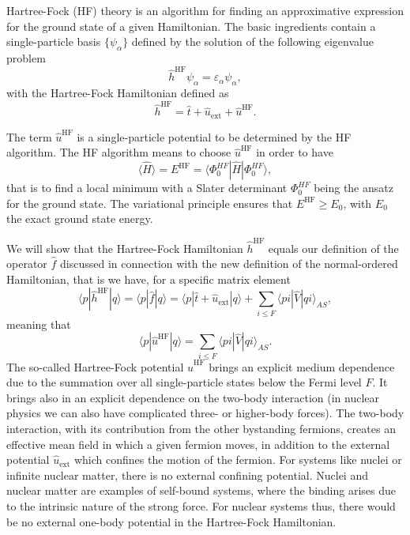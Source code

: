 Hartree-Fock (HF) theory is an algorithm for finding an approximative
expression for the ground state of a given Hamiltonian. The basic
ingredients contain  a single-particle basis $\{\psi_{\alpha}\}$ defined by the solution of the following eigenvalue problem
\[ 
\hat{h}^{\mathrm{HF}}\psi_{\alpha} = \varepsilon_{\alpha}\psi_{\alpha},
\]
with the Hartree-Fock Hamiltonian defined as
\[
\hat{h}^{\mathrm{HF}}=\hat{t}+\hat{u}_{\mathrm{ext}}+\hat{u}^{\mathrm{HF}}.
\]

The term $\hat{u}^{\mathrm{HF}}$ is a single-particle potential to be
determined by the HF algorithm. The HF algorithm means to choose $\hat{u}^{\mathrm{HF}}$ in order to
have
\[ \langle \hat{H} \rangle = E^{\mathrm{HF}}= \langle \Phi_0^{HF} | \hat{H}|\Phi_0^{HF} \rangle,
\]
that is to find a local minimum with a Slater determinant $\Phi_0^{HF}$
being the ansatz for the ground state.  The variational principle
ensures that $E^{\mathrm{HF}} \ge E_0$, with $E_0$ the exact ground
state energy.

We will show that the Hartree-Fock Hamiltonian $\hat{h}^{\mathrm{HF}}$
equals our definition of the operator $\hat{f}$ discussed in
connection with the new definition of the normal-ordered Hamiltonian, that is we have, for a specific matrix element
\[
\langle p |\hat{h}^{\mathrm{HF}}| q \rangle =\langle p |\hat{f}| q \rangle=\langle p|\hat{t}+\hat{u}_{\mathrm{ext}}|q \rangle +\sum_{i\le F} \langle pi | \hat{V} | qi\rangle_{AS},
\]
meaning that
\[
\langle p|\hat{u}^{\mathrm{HF}}|q\rangle = \sum_{i\le F} \langle pi | \hat{V} | qi\rangle_{AS}.
\]
The so-called Hartree-Fock potential $\hat{u}^{\mathrm{HF}}$ brings an
explicit medium dependence due to the summation over all
single-particle states below the Fermi level $F$. It brings also in an
explicit dependence on the two-body interaction (in nuclear physics we
can also have complicated three- or higher-body forces). The two-body
interaction, with its contribution from the other bystanding fermions,
creates an effective mean field in which a given fermion moves, in
addition to the external potential $\hat{u}_{\mathrm{ext}}$ which
confines the motion of the fermion. For systems like nuclei or infinite nuclear matter, there is
no external confining potential. Nuclei and nuclear matter are examples of self-bound
systems, where the binding arises due to the intrinsic nature of the
strong force. For nuclear systems thus, there would be no external
one-body potential in the Hartree-Fock Hamiltonian.


